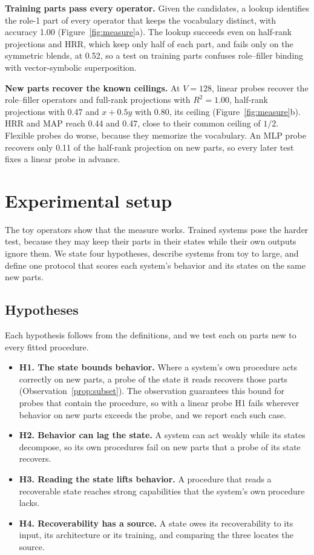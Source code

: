 \documentclass[10pt]{article}
\theoremstyle{plain}
\theoremstyle{remark}
\begin{document}
\textbf{Training parts pass every operator.} Given the candidates, a lookup identifies the role-1 part of every operator that keeps the vocabulary distinct, with accuracy 1.00 (Figure~\ref{fig:measure}a). The lookup succeeds even on half-rank projections and HRR, which keep only half of each part, and fails only on the symmetric blends, at 0.52, so a test on training parts confuses role--filler binding with vector-symbolic superposition.

\textbf{New parts recover the known ceilings.} At $V = 128$, linear probes recover the role--filler operators and full-rank projections with $R^2 = 1.00$, half-rank projections with 0.47 and $x + 0.5y$ with 0.80, its ceiling (Figure~\ref{fig:measure}b). HRR and MAP reach 0.44 and 0.47, close to their common ceiling of $1/2$. Flexible probes do worse, because they memorize the vocabulary. An MLP probe recovers only 0.11 of the half-rank projection on new parts, so every later test fixes a linear probe in advance.

\section{Experimental setup}
\label{sec:experiments}

The toy operators show that the measure works. Trained systems pose the harder test, because they may keep their parts in their states while their own outputs ignore them. We state four hypotheses, describe systems from toy to large, and define one protocol that scores each system's behavior and its states on the same new parts.

\subsection{Hypotheses}

Each hypothesis follows from the definitions, and we test each on parts new to every fitted procedure.
\begin{itemize}
  \item \textbf{H1. The state bounds behavior.} Where a system's own procedure acts correctly on new parts, a probe of the state it reads recovers those parts (Observation~\ref{prop:subset}). The observation guarantees this bound for probes that contain the procedure, so with a linear probe H1 fails wherever behavior on new parts exceeds the probe, and we report each such case.
  \item \textbf{H2. Behavior can lag the state.} A system can act weakly while its states decompose, so its own procedures fail on new parts that a probe of its state recovers.
  \item \textbf{H3. Reading the state lifts behavior.} A procedure that reads a recoverable state reaches strong capabilities that the system's own procedure lacks.
  \item \textbf{H4. Recoverability has a source.} A state owes its recoverability to its input, its architecture or its training, and comparing the three locates the source.
\end{itemize}
\end{document}
